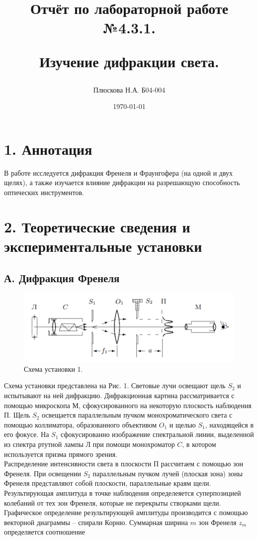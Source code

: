 \documentclass[a4paper,12pt]{report}
\title{Отчёт по лабораторной работе №4.3.1. 

Изучение дифракции света.}
\author{Плюскова Н.А. Б04-004 }
\date{\today}
\begin{document}
\maketitle
\section*{1. Аннотация}
В работе исследуется дифракция Френеля и Фраунгофера (на одной и двух щелях), а также изучается влияние дифракции на разрешающую способность оптических инструментов. 

\section*{2. Теоретические сведения и экспериментальные установки}
\subsection*{А. Дифракция Френеля}
\begin{figure}[h]
\includegraphics[scale=0.7]{0.png}
\centering
\caption{Схема установки 1.}
\end{figure}
Схема установки представлена на Рис. 1. Световые лучи освещают щель $S_2$ и испытывают на ней дифракцию. Дифракционная картина рассматривается с помощью микроскопа М, сфокусированного на некоторую плоскость наблюдения П. Щель $S_2$ освещается параллельным пучком монохроматического света с помощью коллиматора, образованного объективом $O_1$ и щелью $S_1$, находящейся в его фокусе. На $S_1$ сфокусированно изображение спектральной линии, выделенной из спектра ртутной лампы Л при помощи монохроматор $C$, в котором используется призма прямого зрения. \\
Распределение интенсивности света в плоскости П рассчитаем с помощью зон Френеля. При освещении $S_2$ параллельным пучком лучей (плоская зона) зоны Френеля представляют собой плоскости, параллельные краям щели. Результирующая амплитуда в точке наблюдения определеяется суперпозицией колебаний от тех зон Френеля, которые не перекрыты створками щели. Графическое определение результирующей амплитуды производится с помощью векторной диаграммы -- спирали Корню. Суммарная ширина $m$ зон Френеля $z_m$ определяется соотношение
\end{document}
